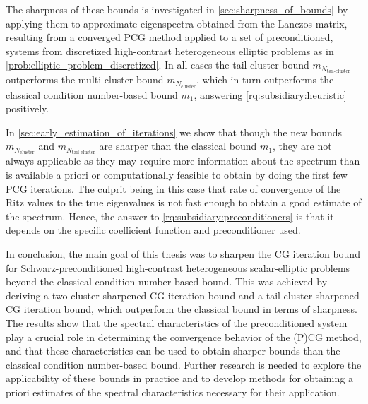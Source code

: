 The sharpness of these bounds is investigated in \cref{sec:sharpness_of_bounds} by applying them to approximate eigenspectra obtained from the Lanczos matrix, resulting from a converged PCG method applied to a set of preconditioned, systems from discretized high-contrast heterogeneous elliptic problems as in \cref{prob:elliptic_problem_discretized}. In all cases the tail-cluster bound $m_{N_{\text{tail-cluster}}}$ outperforms the multi-cluster bound $m_{N_{\text{cluster}}}$, which in turn outperforms the classical condition number-based bound $m_1$, answering \cref{rq:subsidiary:heuristic} positively.

In \cref{sec:early_estimation_of_iterations} we show that though the new bounds $m_{N_{\text{cluster}}}$ and $m_{N_{\text{tail-cluster}}}$ are sharper than the classical bound $m_1$, they are not always applicable as they may require more information about the spectrum than is available a priori or computationally feasible to obtain by doing the first few PCG iterations. The culprit being in this case that rate of convergence of the Ritz values to the true eigenvalues is not fast enough to obtain a good estimate of the spectrum. Hence, the answer to \cref{rq:subsidiary:preconditioners} is that it depends on the specific coefficient function and preconditioner used.

In conclusion, the main goal of this thesis was to sharpen the CG iteration bound for Schwarz-preconditioned high-contrast heterogeneous scalar-elliptic problems beyond the classical condition number-based bound. This was achieved by deriving a two-cluster sharpened CG iteration bound and a tail-cluster sharpened CG iteration bound, which outperform the classical bound in terms of sharpness. The results show that the spectral characteristics of the preconditioned system play a crucial role in determining the convergence behavior of the (P)CG method, and that these characteristics can be used to obtain sharper bounds than the classical condition number-based bound. Further research is needed to explore the applicability of these bounds in practice and to develop methods for obtaining a priori estimates of the spectral characteristics necessary for their application.